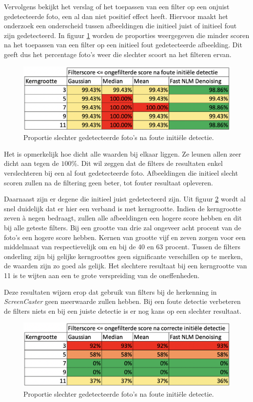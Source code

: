 Vervolgens bekijkt het verslag of het toepassen van een filter op een onjuist gedetecteerde foto, een al dan niet positief effect heeft.
Hiervoor maakt het onderzoek een onderscheid tussen afbeeldingen die initieel juist of initieel fout zijn gedetecteerd. 
In figuur \ref{fig:initieelfout} worden de proporties weergegeven die minder scoren na het toepassen van een filter op een initieel fout gedetecteerde afbeelding. Dit geeft dus het percentage foto's weer die slechter scoort na het filteren ervan.

\begin{figure}[h!]
  \includegraphics[width=\linewidth]{img/initieelFout}
  \caption{Proportie slechter gedetecteerde foto's na foute initiële detectie.}
  \label{fig:initieelfout}
\end{figure}

Het is opmerkelijk hoe dicht alle waarden bij elkaar liggen. Ze leunen allen zeer dicht aan tegen de $100\%$. Dit wil zeggen dat de filters de resultaten enkel verslechteren bij een al fout gedetecteerde foto. Afbeeldingen die initieel slecht scoren zullen na de filtering geen beter, tot fouter resultaat opleveren. 

Daarnaast zijn er degene die initieel juist gedetecteerd zijn. Uit figuur \ref{fig:initieeljuist} wordt al snel duidelijk dat er hier een verband is met kerngrootte. Indien de kerngrootte zeven à negen bedraagt, zullen alle afbeeldingen een hogere score hebben en dit bij alle geteste filters. Bij een grootte van drie zal ongeveer acht procent van de foto's een hogere score hebben. Kernen van grootte vijf en zeven zorgen voor een middelmaat van respectievelijk om en bij de 40 en 63 procent. Tussen de filters onderling zijn bij gelijke kerngroottes geen significante verschillen op te merken, de waarden zijn zo goed als gelijk. Het slechtere resultaat bij een kerngrootte van 11 is te wijten aan een te grote verspreiding van de oneffenheden.

Deze resultaten wijzen erop dat gebruik van filters bij de herkenning in {\it ScreenCaster} geen meerwaarde zullen hebben. Bij een foute detectie verbeteren de filters niets en bij een juiste detectie is er nog kans op een slechter resultaat.

\begin{figure}[h!]
  \includegraphics[width=\linewidth]{img/initieeljuist}
  \caption{Proportie slechter gedetecteerde foto's na foute initiële detectie.}
  \label{fig:initieeljuist}
\end{figure}
